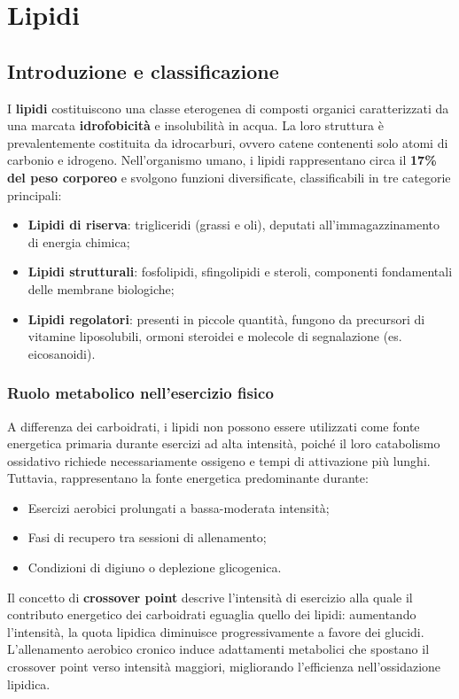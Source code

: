 \documentclass[12pt,a4paper]{report}
\begin{document}
\chapter{Lipidi}
\section{Introduzione e classificazione}
I \textbf{lipidi} costituiscono una classe eterogenea di composti organici caratterizzati da una marcata \textbf{idrofobicità} e insolubilità in acqua. La loro struttura è prevalentemente costituita da idrocarburi, ovvero catene contenenti solo atomi di carbonio e idrogeno. Nell'organismo umano, i lipidi rappresentano circa il \textbf{17\% del peso corporeo} e svolgono funzioni diversificate, classificabili in tre categorie principali:
\begin{itemize}
\item \textbf{Lipidi di riserva}: trigliceridi (grassi e oli), deputati all'immagazzinamento di energia chimica;
\item \textbf{Lipidi strutturali}: fosfolipidi, sfingolipidi e steroli, componenti fondamentali delle membrane biologiche;
\item \textbf{Lipidi regolatori}: presenti in piccole quantità, fungono da precursori di vitamine liposolubili, ormoni steroidei e molecole di segnalazione (es. eicosanoidi).
\end{itemize}
\subsection{Ruolo metabolico nell'esercizio fisico}
A differenza dei carboidrati, i lipidi non possono essere utilizzati come fonte energetica primaria durante esercizi ad alta intensità, poiché il loro catabolismo ossidativo richiede necessariamente ossigeno e tempi di attivazione più lunghi. Tuttavia, rappresentano la fonte energetica predominante durante:
\begin{itemize}
\item Esercizi aerobici prolungati a bassa-moderata intensità;
\item Fasi di recupero tra sessioni di allenamento;
\item Condizioni di digiuno o deplezione glicogenica.
\end{itemize}
Il concetto di \textbf{crossover point} descrive l'intensità di esercizio alla quale il contributo energetico dei carboidrati eguaglia quello dei lipidi: aumentando l'intensità, la quota lipidica diminuisce progressivamente a favore dei glucidi. L'allenamento aerobico cronico induce adattamenti metabolici che spostano il crossover point verso intensità maggiori, migliorando l'efficienza nell'ossidazione lipidica.
\end{document}
